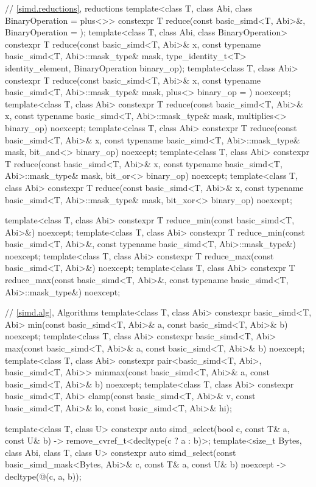 \begin{codeblock}
{  // \ref{simd.reductions},  reductions
  template<class T, class Abi, class BinaryOperation = plus<>>
    constexpr T reduce(const basic_simd<T, Abi>&, BinaryOperation = {});
  template<class T, class Abi, class BinaryOperation>
    constexpr T reduce(const basic_simd<T, Abi>& x,
      const typename basic_simd<T, Abi>::mask_type& mask, type_identity_t<T> identity_element,
      BinaryOperation binary_op);
  template<class T, class Abi>
    constexpr T reduce(const basic_simd<T, Abi>& x,
      const typename basic_simd<T, Abi>::mask_type& mask, plus<> binary_op = {}) noexcept;
  template<class T, class Abi>
    constexpr T reduce(const basic_simd<T, Abi>& x,
      const typename basic_simd<T, Abi>::mask_type& mask, multiplies<> binary_op) noexcept;
  template<class T, class Abi>
    constexpr T reduce(const basic_simd<T, Abi>& x,
      const typename basic_simd<T, Abi>::mask_type& mask, bit_and<> binary_op) noexcept;
  template<class T, class Abi>
    constexpr T reduce(const basic_simd<T, Abi>& x,
      const typename basic_simd<T, Abi>::mask_type& mask, bit_or<> binary_op) noexcept;
  template<class T, class Abi>
    constexpr T reduce(const basic_simd<T, Abi>& x,
      const typename basic_simd<T, Abi>::mask_type& mask, bit_xor<> binary_op) noexcept;

  template<class T, class Abi>
    constexpr T reduce_min(const basic_simd<T, Abi>&) noexcept;
  template<class T, class Abi>
    constexpr T reduce_min(const basic_simd<T, Abi>&,
                           const typename basic_simd<T, Abi>::mask_type&) noexcept;
  template<class T, class Abi>
    constexpr T reduce_max(const basic_simd<T, Abi>&) noexcept;
  template<class T, class Abi>
    constexpr T reduce_max(const basic_simd<T, Abi>&,
                           const typename basic_simd<T, Abi>::mask_type&) noexcept;

  // \ref{simd.alg}, Algorithms
  template<class T, class Abi>
    constexpr basic_simd<T, Abi>
      min(const basic_simd<T, Abi>& a, const basic_simd<T, Abi>& b) noexcept;
  template<class T, class Abi>
    constexpr basic_simd<T, Abi>
      max(const basic_simd<T, Abi>& a, const basic_simd<T, Abi>& b) noexcept;
  template<class T, class Abi>
    constexpr pair<basic_simd<T, Abi>, basic_simd<T, Abi>>
      minmax(const basic_simd<T, Abi>& a, const basic_simd<T, Abi>& b) noexcept;
  template<class T, class Abi>
    constexpr basic_simd<T, Abi>
      clamp(const basic_simd<T, Abi>& v, const basic_simd<T, Abi>& lo,
            const basic_simd<T, Abi>& hi);

  template<class T, class U>
    constexpr auto simd_select(bool c, const T& a, const U& b)
    -> remove_cvref_t<decltype(c ? a : b)>;
  template<size_t Bytes, class Abi, class T, class U>
    constexpr auto simd_select(const basic_simd_mask<Bytes, Abi>& c, const T& a, const U& b)
    noexcept -> decltype(@\simdselect@(c, a, b));
}
\end{codeblock}

